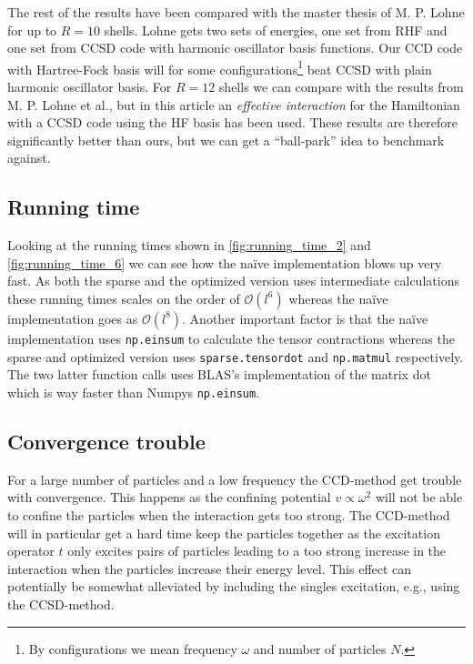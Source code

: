 \documentclass[
    a4paper, aps, twocolumn, floatfix, superscriptaddress,
    nofootinbib]{revtex4-1}
\newcommand{\1}{\mathds{1}}
\begin{document}
        The rest of the results have been compared with the master thesis of M.
        P.  Lohne\cite{lohne2010coupled} for up to $R = 10$ shells. Lohne gets
        two sets of energies, one set from RHF and one set from CCSD code with
        harmonic oscillator basis functions. Our CCD code with Hartree-Fock
        basis will for some configurations\footnote{By configurations we mean
        frequency $\omega$ and number of particles $N$.} beat CCSD with plain
        harmonic oscillator basis. For $R = 12$ shells we can compare with the
        results from M. P. Lohne et al.\cite{lohne2011ab}, but in this article
        an \emph{effective interaction} for the Hamiltonian with a CCSD code
        using the HF basis has been used. These results are therefore
        significantly better than ours, but we can get a ``ball-park'' idea to
        benchmark against.

    \subsection{Running time}
        Looking at the running times shown in \autoref{fig:running_time_2} and
        \autoref{fig:running_time_6} we can see how the naïve implementation
        blows up very fast. As both the sparse and the optimized version uses
        intermediate calculations these running times scales on the order of
        $\mathcal{O}(l^6)$ whereas the naïve implementation goes as
        $\mathcal{O}(l^8)$. Another important factor is that the naïve
        implementation uses \texttt{np.einsum} to calculate the tensor
        contractions whereas the sparse and optimized version uses
        \texttt{sparse.tensordot} and \texttt{np.matmul} respectively. The two
        latter function calls uses BLAS's implementation of the matrix dot which
        is way faster than Numpys \texttt{np.einsum}.

    \subsection{Convergence trouble}
        For a large number of particles and a low frequency the CCD-method get
        trouble with convergence. This happens as the confining potential $v
        \propto \omega^2$ will not be able to confine the particles when the
        interaction gets too strong. The CCD-method will in particular get a
        hard time keep the particles together as the excitation operator $t$
        only excites pairs of particles leading to a too strong increase in the
        interaction when the particles increase their energy level. This effect
        can potentially be somewhat alleviated by including the singles
        excitation, e.g., using the CCSD-method.
\end{document}
